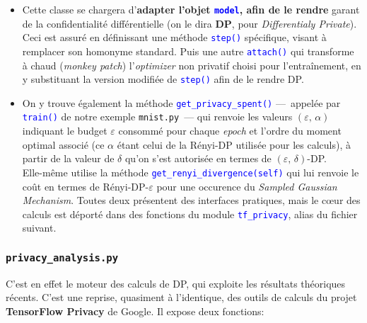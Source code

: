 \documentclass[a4paper,11pt]{article} %
\newcommand{\file}[1]{\colorbox{blue!10}{\texttt{#1}}}
\newcommand{\code}[1]{\textcolor{blue}{\texttt{#1}}}
\begin{document}
\begin{itemize}
    \item 
     Cette classe se chargera d'\textbf{adapter l'objet \code{model}, afin de le rendre} garant de la confidentialité différentielle (on le dira \textbf{DP}, pour \emph{Differentialy Private}). Ceci est assuré en définissant une méthode \code{step()} spécifique, visant à remplacer son homonyme standard. Puis une autre \code{attach()} qui transforme à chaud (\og \emph{monkey patch}\fg{}) l'\emph{optimizer} non privatif choisi pour l'entraînement, en y substituant la version modifiée de \code{step()} afin de le rendre DP.
    \item 
    On y trouve également la méthode \code{get\_privacy\_spent()} ---~appelée par \code{train()} de notre exemple \file{mnist.py}~--- qui renvoie les valeurs $(\varepsilon,\,\alpha)$ indiquant le budget $\varepsilon$ consommé  pour chaque \emph{epoch} et l'ordre du moment optimal associé (ce $\alpha$ étant celui de la Rényi-DP utilisée pour les calculs), à partir de la valeur de $\delta$ qu'on s'est autorisée en termes de $(\varepsilon,\,\delta)$-DP.\\
    Elle-même utilise la méthode \code{get\_renyi\_divergence(self)} qui lui renvoie le coût en termes de Rényi-DP-$\varepsilon$ pour une occurence du \emph{Sampled Gaussian Mechanism}. Toutes deux présentent des interfaces pratiques, mais le cœur des calculs est déporté dans des fonctions du module \code{tf\_privacy}, alias du fichier suivant.
\end{itemize}
%
\subsubsection{\file{privacy\_analysis.py}}
%
C'est en effet le moteur des calculs de DP, qui exploite les résultats théoriques récents. C'est une reprise, quasiment à l'identique, des outils de calculs du projet \textbf{TensorFlow Privacy} de Google. Il expose deux fonctions:
\end{document}
